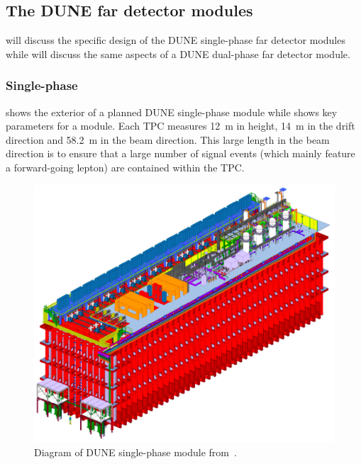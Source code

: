 \subsection{The DUNE far detector modules}
\label{sec:dune:fd:modules}

 will discuss the specific design of the DUNE single-phase far detector modules while  will discuss the same aspects of a DUNE dual-phase far detector module. 

\subsubsection{Single-phase}
\label{sec:dune:fd:modules:singlephase}

 shows the exterior of a planned DUNE single-phase module while  shows key parameters for a module.
Each TPC measures \SI{12}{\metre} in height, \SI{14}{\metre} in the drift direction and \SI{58.2}{\metre} in the beam direction.
This large length in the beam direction is to ensure that a large number of signal events (which mainly feature a forward-going lepton) are contained within the TPC.

\begin{figure}[h]
  \centering
  \includegraphics[width=.7\linewidth]{files/figures/dune_detector/spDiagram}
  \caption[Diagram of a DUNE single phase module.]{Diagram of DUNE single-phase module from~\cite{tdrVol4}.}
  \label{fig:spDiagram}
\end{figure}

